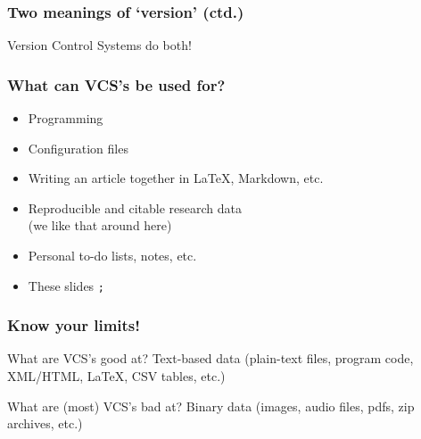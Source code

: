 \documentclass[12pt]{beamer}
\newcommand{\rparen}{\char41}
\begin{document}
\begin{frame}
  \frametitle{Two meanings of `version' (ctd.)}

  Version Control Systems do both!\\
\end{frame}

\begin{frame}
  \frametitle{What can VCS's be used for?}

  \begin{itemize}
    \item Programming
    \item Configuration files
    \item Writing an article together in \LaTeX, Markdown, etc.
    \item \alert{Reproducible and citable research data}\\
      (we like that around here)
    \item Personal to-do lists, notes, etc.
    \item These slides \texttt{;\rparen}
  \end{itemize}
\end{frame}

\begin{frame}
  \frametitle{Know your limits!}

  \begin{block}{What are VCS's good at?}
    Text-based data
    (plain-text files, program code, XML/HTML, \LaTeX, CSV tables, etc.)
  \end{block}

  \begin{block}{What are (most) VCS's bad at?}
    Binary data
    (images, audio files, pdfs, zip archives, etc.)
  \end{block}
\end{frame}
\end{document}
